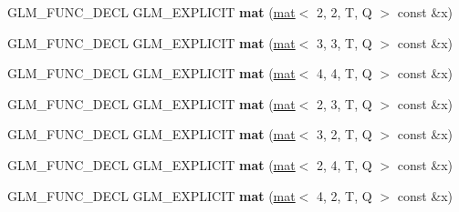 \begin{DoxyCompactItemize}
G\+L\+M\+\_\+\+F\+U\+N\+C\+\_\+\+D\+E\+CL G\+L\+M\+\_\+\+E\+X\+P\+L\+I\+C\+IT {\bfseries mat} (\hyperlink{structglm_1_1mat}{mat}$<$ 2, 2, T, Q $>$ const \&x)
\item 
\mbox{\label{structglm_1_1mat_3_014_00_013_00_01T_00_01Q_01_4_a8480d316b56b88a08273b7ae7044ce08}} 
G\+L\+M\+\_\+\+F\+U\+N\+C\+\_\+\+D\+E\+CL G\+L\+M\+\_\+\+E\+X\+P\+L\+I\+C\+IT {\bfseries mat} (\hyperlink{structglm_1_1mat}{mat}$<$ 3, 3, T, Q $>$ const \&x)
\item 
\mbox{\label{structglm_1_1mat_3_014_00_013_00_01T_00_01Q_01_4_ae8dfd6579c780ef7c79060837c388f29}} 
G\+L\+M\+\_\+\+F\+U\+N\+C\+\_\+\+D\+E\+CL G\+L\+M\+\_\+\+E\+X\+P\+L\+I\+C\+IT {\bfseries mat} (\hyperlink{structglm_1_1mat}{mat}$<$ 4, 4, T, Q $>$ const \&x)
\item 
\mbox{\label{structglm_1_1mat_3_014_00_013_00_01T_00_01Q_01_4_a3993874173e85dbe2730fee1cf35c6b6}} 
G\+L\+M\+\_\+\+F\+U\+N\+C\+\_\+\+D\+E\+CL G\+L\+M\+\_\+\+E\+X\+P\+L\+I\+C\+IT {\bfseries mat} (\hyperlink{structglm_1_1mat}{mat}$<$ 2, 3, T, Q $>$ const \&x)
\item 
\mbox{\label{structglm_1_1mat_3_014_00_013_00_01T_00_01Q_01_4_a3c8f7ef04bcc5a8561e08631f7a4bcf8}} 
G\+L\+M\+\_\+\+F\+U\+N\+C\+\_\+\+D\+E\+CL G\+L\+M\+\_\+\+E\+X\+P\+L\+I\+C\+IT {\bfseries mat} (\hyperlink{structglm_1_1mat}{mat}$<$ 3, 2, T, Q $>$ const \&x)
\item 
\mbox{\label{structglm_1_1mat_3_014_00_013_00_01T_00_01Q_01_4_a2dd5c1b06710666fb40d04fbdf31cc87}} 
G\+L\+M\+\_\+\+F\+U\+N\+C\+\_\+\+D\+E\+CL G\+L\+M\+\_\+\+E\+X\+P\+L\+I\+C\+IT {\bfseries mat} (\hyperlink{structglm_1_1mat}{mat}$<$ 2, 4, T, Q $>$ const \&x)
\item 
\mbox{\label{structglm_1_1mat_3_014_00_013_00_01T_00_01Q_01_4_aa94120323ab82d11fbf17be534d699a5}} 
G\+L\+M\+\_\+\+F\+U\+N\+C\+\_\+\+D\+E\+CL G\+L\+M\+\_\+\+E\+X\+P\+L\+I\+C\+IT {\bfseries mat} (\hyperlink{structglm_1_1mat}{mat}$<$ 4, 2, T, Q $>$ const \&x)
\item 

\end{DoxyCompactItemize}
